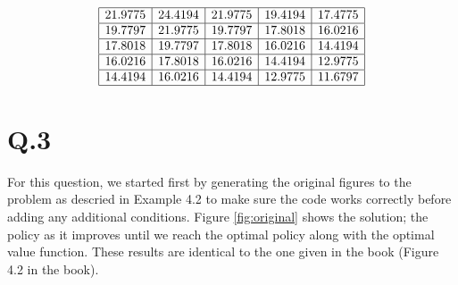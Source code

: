 \documentclass[12pt] {article}
\begin{document}
\[
\begin{array}{|c|c|c|c|c|}
\hline
21.9775    & 24.4194     & 21.9775   & 19.4194  &  17.4775   \\
\hline
19.7797 &  21.9775 &  19.7797 &  17.8018 &  16.0216\\
\hline
17.8018  & 19.7797 &  17.8018 &  16.0216 &  14.4194\\
\hline
16.0216 &  17.8018 &  16.0216  & 14.4194  & 12.9775\\
\hline
14.4194  & 16.0216  & 14.4194 &  12.9775 &  11.6797\\
\hline
\end{array} 
\]



\section*{Q.3}
For this question, we started first by generating the original figures to the problem as descried in Example 4.2 to make sure the code works correctly before adding any additional conditions. Figure \ref{fig:original} shows the solution; the policy as it improves until we reach the optimal policy along with the optimal value function. These results are identical to the one given in the book (Figure 4.2 in the book).
\end{document}
